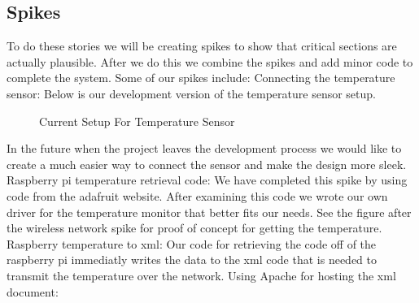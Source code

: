 \documentclass{report}
\begin{document}
\subsection*{Spikes}
To do these stories we will be creating spikes to show that critical sections are actually plausible. 
After we do this we combine the spikes and add minor code to complete the system.
Some of our spikes include:
\newline
Connecting the temperature sensor:
\newline
\indent
Below is our development version of the temperature sensor setup.
\begin{figure}[H]
\caption{Current Setup For Temperature Sensor}
\end{figure}
In the future when the project leaves the development process we would like to create a much easier way to connect the sensor and make the design more sleek.
\newline
Raspberry pi temperature retrieval code:
\newline
\indent
We have completed this spike by using code from the adafruit website.
After examining this code we wrote our own driver for the temperature monitor that better fits our needs.
See the figure after the wireless network spike for proof of concept for getting the temperature.
\newline
Raspberry temperature to xml:
\newline
\indent
Our code for retrieving the code off of the raspberry pi immediatly writes the data to the xml code that is needed to transmit the temperature over the network. 
\newline
Using Apache for hosting the xml document:
\newline
\end{document}
